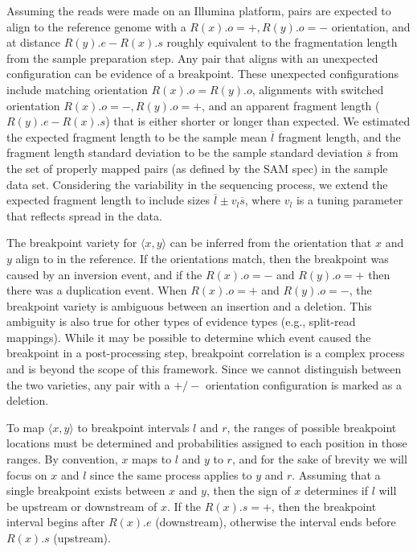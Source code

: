 \documentclass[10pt]{bmc_article}
\newenvironment{bmcformat}{\begin{raggedright}\baselineskip20pt\sloppy\setboolean{publ}{false}}{\end{raggedright}\baselineskip20pt\sloppy}
\begin{document}
\begin{bmcformat}
Assuming the reads were made on an Illumina platform, pairs are expected to
align to the reference genome with a $R(x).o=+, R(y).o=-$ orientation, and at
distance $R(y).e - R(x).s$ roughly equivalent to the fragmentation length from
the sample preparation step.  Any pair that aligns with an unexpected
configuration can be evidence of a breakpoint.  These unexpected configurations
include matching orientation $R(x).o = R(y).o$, alignments with switched
orientation $R(x).o=-, R(y).o=+$, and an apparent fragment length ($R(y).e -
R(x).s$) that is either shorter or longer than expected.  We estimated the
expected fragment length to be the sample mean $\overline{l}$ fragment length,
and the fragment length standard deviation to be the sample standard deviation
$\overline{s}$ from the set of properly mapped pairs (as defined by the SAM
spec) in the sample data set.  Considering the variability in the sequencing
process, we extend the expected fragment length to include sizes
$\overline{l}\pm v_l \overline{s}$, where $v_l$ is a tuning parameter that
reflects spread in the data.

The breakpoint variety for $\langle x,y \rangle$ can be inferred from the
orientation that $x$ and $y$ align to in the reference.  If the orientations
match, then the breakpoint was caused by an inversion event, and if the
$R(x).o=-$ and $R(y).o=+$ then there was a duplication event.  When $R(x).o=+$
and $R(y).o=-$, the breakpoint variety is ambiguous between an insertion and a
deletion.  This ambiguity is also true for other types of evidence types (e.g.,
split-read mappings).  While it may be possible to determine which event caused
the breakpoint in a post-processing step, breakpoint correlation is a complex
process and is beyond the scope of this framework.  Since we cannot distinguish
between the two varieties, any pair with a $+/-$ orientation configuration is
marked as a deletion.

To map $\langle x,y \rangle$ to breakpoint intervals $l$ and $r$, the ranges of
possible breakpoint locations must be determined and probabilities assigned to
each position in those ranges.  By convention, $x$ maps to $l$ and $y$ to
$r$, and for the sake of brevity we will focus on $x$ and $l$ since the same
process applies to $y$ and $r$.  Assuming that a single breakpoint exists
between $x$ and $y$, then the sign of $x$ determines if $l$ will be upstream
or downstream of $x$.  If the $R(x).s=+$, then the breakpoint interval begins
after $R(x).e$ (downstream), otherwise the interval ends before $R(x).s$
(upstream). 


\end{bmcformat}
\end{document}
